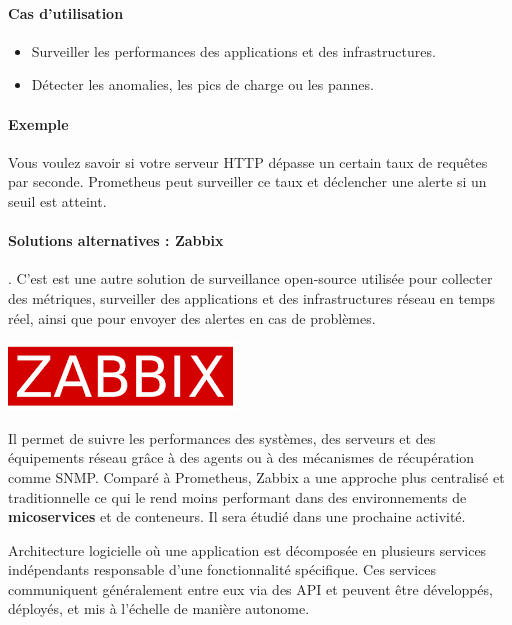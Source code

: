 \documentclass[french, 12pt]{article}%
\newcommand{\itemE}{\item[$\bullet$]}
\newcommand{\titreencadre}{Titre}
\newenvironment{encadre}[1]{\renewcommand{\titreencadre}{#1}
	\begin{mdframed}[style=encadrestyle]
	\vspace{0.5\baselineskip}
	}{%
	\end{mdframed}}
\begin{document}
\paragraph{Cas d'utilisation}
\begin{itemize}
    \itemE Surveiller les performances des applications et des infrastructures.
    \itemE Détecter les anomalies, les pics de charge ou les pannes.
\end{itemize}

\paragraph{Exemple}
Vous voulez savoir si votre serveur HTTP dépasse un certain taux de requêtes par seconde. Prometheus peut surveiller ce taux et déclencher une alerte si un seuil est atteint.

\vspace{0.5cm}
\begin{minipage}{0.75\linewidth}
\paragraph{Solutions alternatives : Zabbix}. C'est est une autre solution de surveillance open-source utilisée pour collecter des métriques, surveiller des applications et des infrastructures réseau en temps réel, ainsi que pour envoyer des alertes en cas de problèmes.
\end{minipage}
\begin{minipage}{0.25\linewidth}
\begin{center}
\includegraphics[scale=0.25]{./ressource/zabbix.png}
\end{center}
\end{minipage}
\vspace{0.25cm}
 Il permet de suivre les performances des systèmes, des serveurs et des équipements réseau grâce à des agents ou à des mécanismes de récupération comme SNMP. 
Comparé à Prometheus, Zabbix a une approche plus centralisé et traditionnelle ce qui le rend moins performant dans des environnements de \textbf{micoservices} et de conteneurs. Il sera étudié dans une prochaine activité.

\begin{encadre}{Microservices}
Architecture logicielle où une application est décomposée en plusieurs services indépendants responsable d'une fonctionnalité spécifique. Ces services communiquent généralement entre eux via des API et peuvent être développés, déployés, et mis à l'échelle de manière autonome.
\end{encadre}
\end{document}

